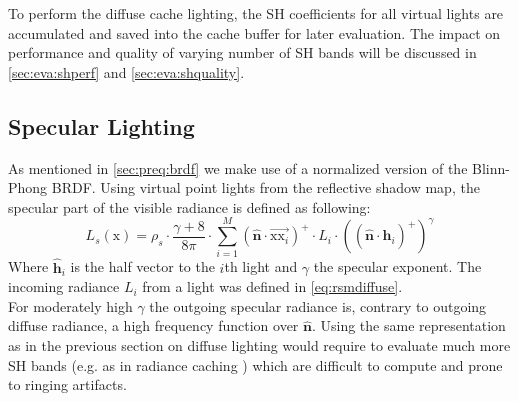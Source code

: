 \documentclass[thesis.tex]{subfiles}
\begin{document}
To perform the diffuse cache lighting, the SH coefficients for all virtual lights are accumulated and saved into the cache buffer for later evaluation.
The impact on performance and quality of varying number of SH bands will be discussed in \autoref{sec:eva:shperf} and \autoref{sec:eva:shquality}.

\subsection{Specular Lighting} \label{sec:impl:specenvmap}
As mentioned in \autoref{sec:preq:brdf} we make use of a normalized version of the Blinn-Phong BRDF.
Using virtual point lights from the reflective shadow map, the specular part of the visible radiance is defined as following:
\begin{equation}
L_s (\mathrm{x}) = \rho_s \cdot \frac{\gamma + 8}{8\pi} \cdot \sum\limits_{i=1}^{M}
(\hat{\mathbf{n}}\cdot \overrightarrow{\mathrm{x}\mathrm{x}_i})^+ \cdot L_i \cdot ((\hat{\mathbf{n}} \cdot \hat{\mathbf{h}}_i)^+)^\gamma
\end{equation}
Where $\hat{\mathbf{h}}_i$ is the half vector to the $i$th light and $\gamma$ the specular exponent.
The incoming radiance $L_i$ from a light was defined in \autoref{eq:rsmdiffuse}.
\\
For moderately high $\gamma$ the outgoing specular radiance is, contrary to outgoing diffuse radiance, a high frequency function over $\hat{\mathbf{n}}$.
Using the same representation as in the previous section on diffuse lighting would require to evaluate much more SH bands (e.g. as in radiance caching \cite{bib:radiancecaching}) which are difficult to compute and prone to ringing artifacts.
\end{document}

